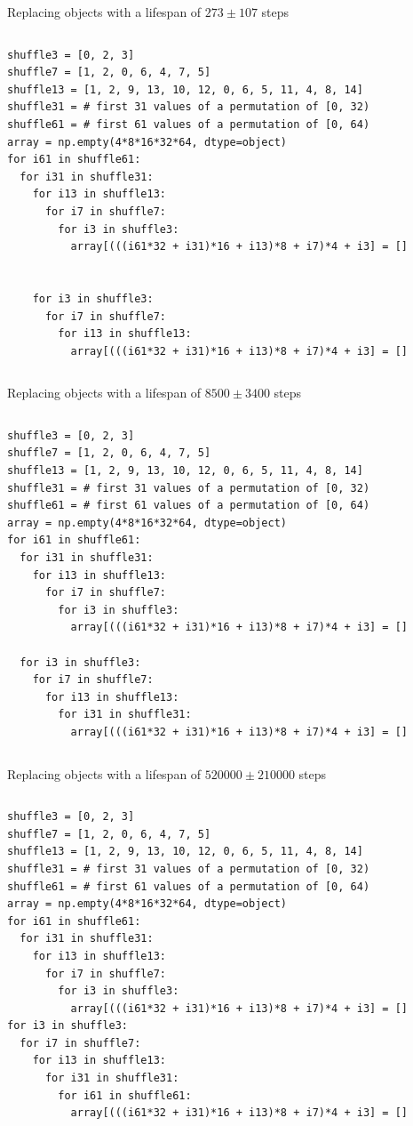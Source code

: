 \documentclass[aspectratio=169]{beamer}
\begin{document}
\begin{frame}[fragile]{Replacing objects with a lifespan of $273 \pm 107$ steps}
\small
\begin{columns}
\begin{verbatim}
shuffle3 = [0, 2, 3]
shuffle7 = [1, 2, 0, 6, 4, 7, 5]
shuffle13 = [1, 2, 9, 13, 10, 12, 0, 6, 5, 11, 4, 8, 14]
shuffle31 = # first 31 values of a permutation of [0, 32)
shuffle61 = # first 61 values of a permutation of [0, 64)
array = np.empty(4*8*16*32*64, dtype=object)
for i61 in shuffle61:
  for i31 in shuffle31:
    for i13 in shuffle13:
      for i7 in shuffle7:
        for i3 in shuffle3:
          array[(((i61*32 + i31)*16 + i13)*8 + i7)*4 + i3] = []


    for i3 in shuffle3:
      for i7 in shuffle7:
        for i13 in shuffle13:
          array[(((i61*32 + i31)*16 + i13)*8 + i7)*4 + i3] = []
\end{verbatim}
\end{columns}
\end{frame}

\begin{frame}[fragile]{Replacing objects with a lifespan of $8500 \pm 3400$ steps}
\small
\begin{columns}
\begin{verbatim}
shuffle3 = [0, 2, 3]
shuffle7 = [1, 2, 0, 6, 4, 7, 5]
shuffle13 = [1, 2, 9, 13, 10, 12, 0, 6, 5, 11, 4, 8, 14]
shuffle31 = # first 31 values of a permutation of [0, 32)
shuffle61 = # first 61 values of a permutation of [0, 64)
array = np.empty(4*8*16*32*64, dtype=object)
for i61 in shuffle61:
  for i31 in shuffle31:
    for i13 in shuffle13:
      for i7 in shuffle7:
        for i3 in shuffle3:
          array[(((i61*32 + i31)*16 + i13)*8 + i7)*4 + i3] = []

  for i3 in shuffle3:
    for i7 in shuffle7:
      for i13 in shuffle13:
        for i31 in shuffle31:
          array[(((i61*32 + i31)*16 + i13)*8 + i7)*4 + i3] = []
\end{verbatim}
\end{columns}
\end{frame}

\begin{frame}[fragile]{Replacing objects with a lifespan of $520000 \pm 210000$ steps}
\small
\begin{columns}
\begin{verbatim}
shuffle3 = [0, 2, 3]
shuffle7 = [1, 2, 0, 6, 4, 7, 5]
shuffle13 = [1, 2, 9, 13, 10, 12, 0, 6, 5, 11, 4, 8, 14]
shuffle31 = # first 31 values of a permutation of [0, 32)
shuffle61 = # first 61 values of a permutation of [0, 64)
array = np.empty(4*8*16*32*64, dtype=object)
for i61 in shuffle61:
  for i31 in shuffle31:
    for i13 in shuffle13:
      for i7 in shuffle7:
        for i3 in shuffle3:
          array[(((i61*32 + i31)*16 + i13)*8 + i7)*4 + i3] = []
for i3 in shuffle3:
  for i7 in shuffle7:
    for i13 in shuffle13:
      for i31 in shuffle31:
        for i61 in shuffle61:
          array[(((i61*32 + i31)*16 + i13)*8 + i7)*4 + i3] = []
\end{verbatim}
\end{columns}
\end{frame}
\end{document}
